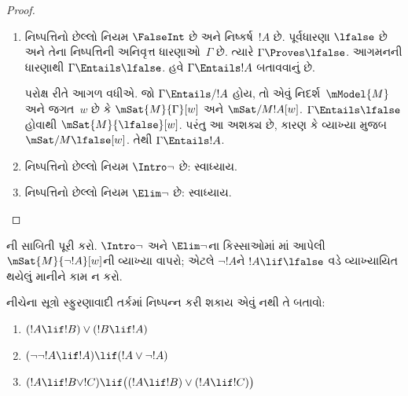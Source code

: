 \begin{proof}
\begin{enumerate}
    ધારો કે $\mSat{M}{\Gamma \cup \Delta}[w]$.
    $\mSat{M}{\Gamma}[w]$ અને
    $\Gamma \Entails !B \lif !C$ હોવાથી
    $\mSat{M}{!B \lif !C}[w]$. વ્યાખ્યા મુજબ,
    $Rww'$ ધરાવતા દરેક $w'$ માટે જો
    $\mSat{M}{!B}[w']$ હોય, તો
    $\mSat{M}{!C}[w']$. $R$ સ્વવાચક હોવાથી
    $Rww'$ ધરાવતા $w'$માં $w$ પોતે પણ આવે છે;
    એટલે જો $\mSat{M}{!B}[w]$ હોય, તો
    $\mSat{M}{!C}[w]$. હવે $\mSat{M}{\Delta}[w]$
    અને $\Delta \Entails !B$ હોવાથી
    $\mSat{M}{!B}[w]$. તેથી ઇચ્છિત
    $\mSat{M}{!C}[w]$ મળે છે.

  \item નિષ્પત્તિનો છેલ્લો નિયમ $\FalseInt$ છે અને
    નિષ્કર્ષ~$!A$ છે. પૂર્વધારણા $\lfalse$ છે અને તેના
    નિષ્પત્તિની અનિવૃત્ત ધારણાઓ~$\Gamma$ છે.
    ત્યારે $\Gamma \Proves \lfalse$. આગમનની ધારણાથી
    $\Gamma \Entails \lfalse$. હવે $\Gamma \Entails !A$
    બતાવવાનું છે.

    પરોક્ષ રીતે આગળ વધીએ. જો $\Gamma \Entails/ !A$
    હોય, તો એવું નિદર્શ~$\mModel{M}$ અને જગત~$w$
    છે કે $\mSat{M}{\Gamma}[w]$ અને
    $\mSat/{M}{!A}[w]$. $\Gamma \Entails \lfalse$
    હોવાથી $\mSat{M}{\lfalse}[w]$. પરંતુ આ અશક્ય
    છે, કારણ કે વ્યાખ્યા મુજબ $\mSat/{M}{\lfalse}[w]$.
    તેથી $\Gamma \Entails !A$.
  \item નિષ્પત્તિનો છેલ્લો નિયમ $\Intro\lnot$ છે: સ્વાધ્યાય.
  \item નિષ્પત્તિનો છેલ્લો નિયમ $\Elim\lnot$ છે: સ્વાધ્યાય.
  \end{enumerate}
\end{proof}

\begin{prob}
  ની સાબિતી પૂરી કરો.
  $\Intro\lnot$ અને $\Elim\lnot$ના કિસ્સાઓમાં
  માં આપેલી
  $\mSat{M}{\lnot !A}[w]$ની વ્યાખ્યા વાપરો;
  એટલે $\lnot !A$ને $!A \lif \lfalse$ વડે
  વ્યાખ્યાયિત થયેલું માનીને કામ ન કરો.
\end{prob}

\begin{prob}
  નીચેના સૂત્રો સ્ફુરણાવાદી તર્કમાં નિષ્પન્ન કરી શકાય એવું
  નથી તે બતાવો:
  \begin{enumerate}
    \item $(!A \lif !B) \lor (!B \lif !A)$
    \item $(\lnot\lnot !A \lif !A) \lif (!A \lor \lnot !A)$
    \item $(!A \lif !B \lor !C) \lif \bigl((!A \lif !B)\lor(!A \lif !C)\bigr)$
  \end{enumerate}
\end{prob}
\endgroup


